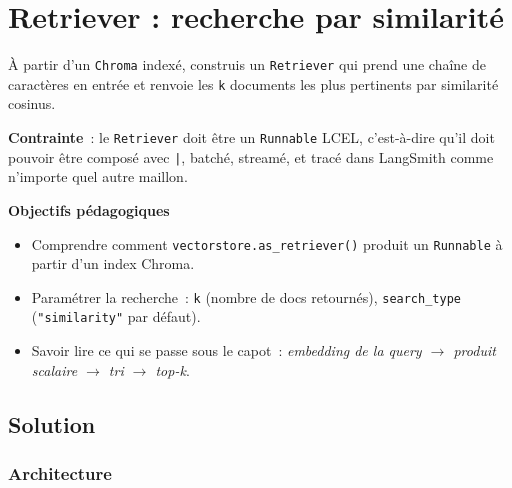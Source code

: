 \documentclass[11pt,a4paper]{article}
\begin{document}
\section{Retriever : recherche par similarité}

\begin{tcolorbox}[title=Exercice 2. Transformer un vectorstore en \texttt{Runnable} LCEL]
À partir d'un \texttt{Chroma} indexé, construis un \texttt{Retriever}
qui prend une chaîne de caractères en entrée et renvoie les \texttt{k}
documents les plus pertinents par similarité cosinus.

\textbf{Contrainte}~: le \texttt{Retriever} doit être un
\texttt{Runnable} LCEL, c'est-à-dire qu'il doit pouvoir être composé
avec \texttt{|}, batché, streamé, et tracé dans LangSmith comme n'importe
quel autre maillon.

\bigskip
\noindent\textbf{Objectifs pédagogiques}
\begin{itemize}[leftmargin=*]
  \item Comprendre comment \texttt{vectorstore.as\_retriever()} produit
        un \texttt{Runnable} à partir d'un index Chroma.
  \item Paramétrer la recherche~: \texttt{k} (nombre de docs retournés),
        \texttt{search\_type} (\texttt{"similarity"} par défaut).
  \item Savoir lire ce qui se passe sous le capot~: \emph{embedding de
        la query $\to$ produit scalaire $\to$ tri $\to$ top-k}.
\end{itemize}
\end{tcolorbox}

\subsection{Solution}

\subsubsection{Architecture}
\end{document}
